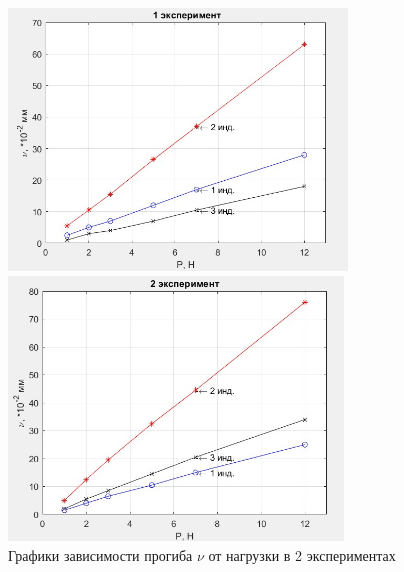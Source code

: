 \documentclass[12pt, a4paper]{article}
\begin{document}
 
\begin{figure}[h]
\begin{minipage}[h]{0.4\linewidth}
\centering
\includegraphics[width = 9cm]{nu_1.jpg}
\end{minipage}
\hfill
\begin{minipage}[h]{0.4\linewidth}
\centering
\includegraphics[width = 8.88cm]{nu_2.jpg}
\end{minipage}
\caption{Графики зависимости прогиба $\nu$ от нагрузки в 2 экспериментах}
\label{nu}
\end{figure}
\end{document}
